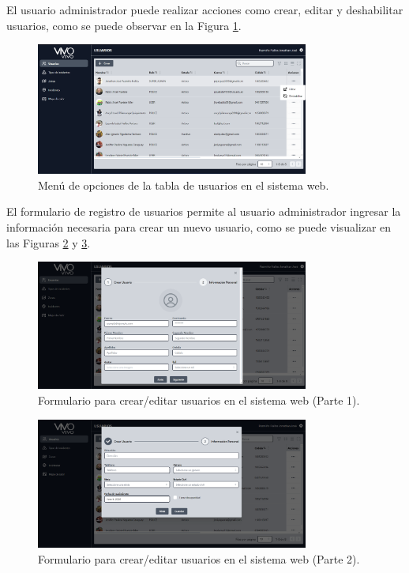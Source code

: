 El usuario administrador puede realizar acciones como crear, editar y deshabilitar usuarios, como se puede observar en la Figura
\ref{fig:menu-tabla-usuarios-web}.

\begin{figure}[H]
    \centering
    \includegraphics[width=0.8\textwidth]{chapters/III-resultados-y-discusion/resources/images/menu-tabla-usuarios-web.png}
    \caption{Menú de opciones de la tabla de usuarios en el sistema web.}
    \label{fig:menu-tabla-usuarios-web}
\end{figure}

El formulario de registro de usuarios permite al usuario administrador ingresar la información
necesaria para crear un nuevo usuario, como se puede visualizar en las Figuras \ref{fig:formulario-usuario-web-1} y
\ref{fig:formulario-usuario-web-2}.

\begin{figure}[H]
    \centering
    \includegraphics[width=0.8\textwidth]{chapters/III-resultados-y-discusion/resources/images/formulario-usuario-web-1.png}
    \caption{Formulario para crear/editar usuarios en el sistema web (Parte 1).}
    \label{fig:formulario-usuario-web-1}
\end{figure}

\begin{figure}[H]
    \centering
    \includegraphics[width=0.8\textwidth]{chapters/III-resultados-y-discusion/resources/images/formulario-usuario-web-2.png}
    \caption{Formulario para crear/editar usuarios en el sistema web (Parte 2).}
    \label{fig:formulario-usuario-web-2}
\end{figure}

